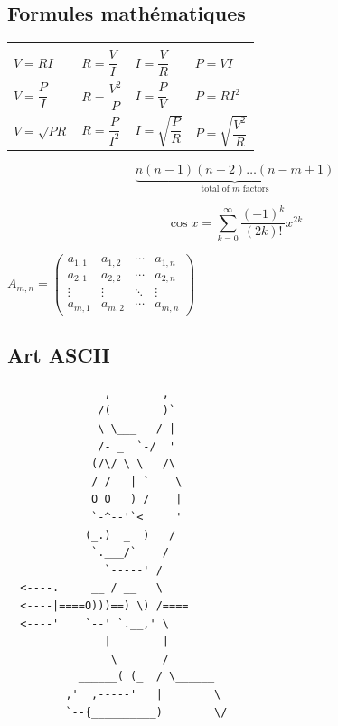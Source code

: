 \subsection{Formules mathématiques}
\begin{table}[ht]
\begin{center}
\begin{tabular}{llll}  
    \hline
    \multicolumn{4}{c}{}\\
    
    \bigskip
    
    $V=RI$&$R=\dfrac{V}{I}$&$I=\dfrac{V}{R}$&$P=VI$\\
    
    \bigskip
    
    $V=\dfrac{P}{I}$&$R=\dfrac{V^{2}}         {P}$&$I=\dfrac{P}{V}$&$P=RI^{2}$\\ 
    
   \bigskip 
    
    $V=\sqrt{PR}$&$R=\dfrac{P}{I^{2}}$&$I=\sqrt{\dfrac{P}{R}}$&$P=\sqrt{\dfrac{V^{2}}{R}}$\\
    \hline
\end{tabular}
\end{center}
\label{tab:multicol}
\end{table}

$$
\underbrace{n(n-1)(n-2)\dots(n-m+1)}_
{\mbox{total of $m$ factors}}
$$

\bigskip  
  
\[\cos x=\sum_{k=0}^{\infty}\frac{(-1)^k}{(2k)!}x^{2k}\]

\bigskip 
\begin{center}
$A_{m,n} =
 \begin{pmatrix}
  a_{1,1} & a_{1,2} & \cdots & a_{1,n} \\
  a_{2,1} & a_{2,2} & \cdots & a_{2,n} \\
  \vdots  & \vdots  & \ddots & \vdots  \\
  a_{m,1} & a_{m,2} & \cdots & a_{m,n}
 \end{pmatrix}$
\end{center}

\subsection{Art ASCII}
\begin{verbatim}
               ,        ,
              /(        )`
              \ \___   / |
              /- _  `-/  '
             (/\/ \ \   /\
             / /   | `    \
             O O   ) /    |
             `-^--'`<     '
            (_.)  _  )   /
             `.___/`    /
               `-----' /
  <----.     __ / __   \
  <----|====O)))==) \) /====
  <----'    `--' `.__,' \
               |        |
                \       /
           ______( (_  / \______
         ,'  ,-----'   |        \
         `--{__________)        \/   
\end{verbatim}










